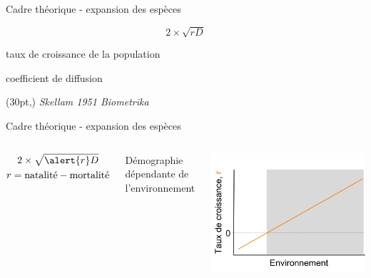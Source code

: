\documentclass[11pt, compress, aspectratio=1610]{beamer}
\newcommand\smallcitation[1]{%
\begin{textblock*}{\textwidth}(30pt,\textheight)
	\raggedleft \footnotesize\textit{#1}
\end{textblock*}}
\providecommand{\tightlist}{%
  \setlength{\itemsep}{0pt}\setlength{\parskip}{0pt}}
\newcommand{\begincols}{\begin{columns}}
\newcommand{\stopcols}{\end{columns}}
\begin{document}
\begin{frame}{Cadre théorique - expansion des espèces}
\protect\hypertarget{cadre-thuxe9orique---expansion-des-espuxe8ces}{}

\begin{LARGE}
$$ 2 \times \sqrt{rD} $$
\end{LARGE}

\begin{description}
\tightlist
\item[r]
taux de croissance de la population
\item[D]
coefficient de diffusion
\end{description}

\smallcitation{Skellam 1951 Biometrika}

\end{frame}

\begin{frame}{Cadre théorique - expansion des espèces}
\protect\hypertarget{cadre-thuxe9orique---expansion-des-espuxe8ces-1}{}

\begincols
{}
\begin{Large}
  \begin{gather*}
    2 \times \sqrt{\alert{r}D} \\
    r = \text{natalité} - \text{mortalité}
  \end{gather*}
\end{Large}

\alert{Démographie} dépendante de l’environnement

\hfill{}
  \centering

\includegraphics[scale=0.43]{figures/croissance.png}

\par
\stopcols

\end{frame}
\end{document}
